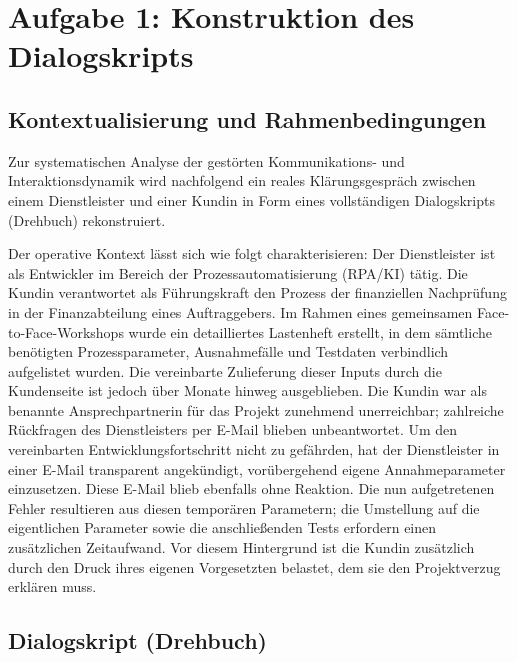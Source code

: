 
\chapter{Aufgabe 1: Konstruktion des Dialogskripts} 
\label{sec:aufgabe1}

\section{Kontextualisierung und Rahmenbedingungen}
Zur systematischen Analyse der gestörten Kommunikations- und Interaktionsdynamik wird nachfolgend ein reales Klärungsgespräch zwischen einem Dienstleister und einer Kundin in Form eines vollständigen Dialogskripts (Drehbuch) rekonstruiert.

Der operative Kontext lässt sich wie folgt charakterisieren: Der Dienstleister ist als Entwickler im Bereich der Prozessautomatisierung (\acs{RPA}/\acs{KI}) tätig. Die Kundin verantwortet als Führungskraft den Prozess der finanziellen Nachprüfung in der Finanzabteilung eines Auftraggebers. Im Rahmen eines gemeinsamen Face-to-Face-Workshops wurde ein detailliertes Lastenheft erstellt, in dem sämtliche benötigten Prozessparameter, Ausnahmefälle und Testdaten verbindlich aufgelistet wurden. Die vereinbarte Zulieferung dieser Inputs durch die Kundenseite ist jedoch über Monate hinweg ausgeblieben. Die Kundin war als benannte Ansprechpartnerin für das Projekt zunehmend unerreichbar; zahlreiche Rückfragen des Dienstleisters per E-Mail blieben unbeantwortet. Um den vereinbarten Entwicklungsfortschritt nicht zu gefährden, hat der Dienstleister in einer E-Mail transparent angekündigt, vorübergehend eigene Annahmeparameter einzusetzen. Diese E-Mail blieb ebenfalls ohne Reaktion. Die nun aufgetretenen Fehler resultieren aus diesen temporären Parametern; die Umstellung auf die eigentlichen Parameter sowie die anschließenden Tests erfordern einen zusätzlichen Zeitaufwand. Vor diesem Hintergrund ist die Kundin zusätzlich durch den Druck ihres eigenen Vorgesetzten belastet, dem sie den Projektverzug erklären muss.

\section{Dialogskript (Drehbuch)}

